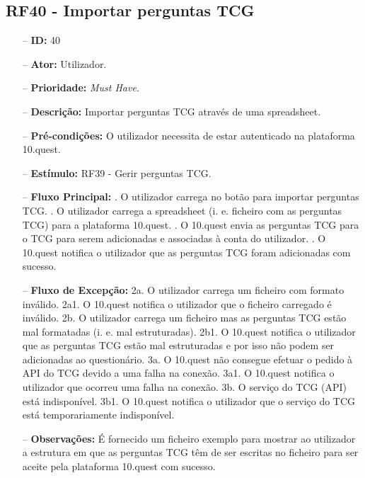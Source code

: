\subsection{RF40 - Importar perguntas TCG}
\begin{itemize}
	\item[--] \textbf{ID:} 40
	\item[--]  \textbf{Ator:} Utilizador.
	\item[--]  \textbf{Prioridade:} \textit{Must Have}.
	\item[--]  \textbf{Descrição:} Importar perguntas TCG através de uma spreadsheet. 
	\item[--]  \textbf{Pré-condições:} O utilizador necessita de estar autenticado na plataforma 10.quest.
	\item[--]  \textbf{Estímulo:}  RF39 - Gerir perguntas TCG.
	\item[--]  \textbf{Fluxo Principal:} 
		. O utilizador carrega no botão para importar perguntas TCG.
		. O utilizador carrega a spreadsheet (i. e. ficheiro com as perguntas TCG) para a plataforma 10.quest.
		. O 10.quest envia as perguntas TCG para o TCG para serem adicionadas e associadas à conta do utilizador.
		. O 10.quest notifica o utilizador que as perguntas TCG foram adicionadas com sucesso.
	\item[--]  \textbf{Fluxo de Excepção:} 
		\subitem 2a. O utilizador carrega um ficheiro com formato inválido.
		\subitem 2a1. O 10.quest notifica o utilizador que o ficheiro carregado é inválido.
		\subitem 2b. O utilizador carrega um ficheiro mas as perguntas TCG estão mal formatadas (i. e. mal estruturadas).
		\subitem 2b1. O 10.quest notifica o utilizador que as perguntas TCG  estão mal estruturadas e por isso não podem ser adicionadas ao questionário.
		\subitem 3a. O 10.quest não consegue efetuar o pedido à API do TCG devido a uma falha na conexão.
		\subitem 3a1. O 10.quest notifica o utilizador que ocorreu uma falha na conexão.
		\subitem 3b. O serviço do TCG (API) está indisponível.
		\subitem 3b1. O 10.quest notifica o utilizador que o serviço do TCG está temporariamente indisponível. 
	\item[--]  \textbf{Observações:} É fornecido um ficheiro exemplo para mostrar ao utilizador a estrutura em que as perguntas TCG  têm de ser escritas no ficheiro para ser aceite pela plataforma 10.quest com sucesso.
\end{itemize}
\newpage


